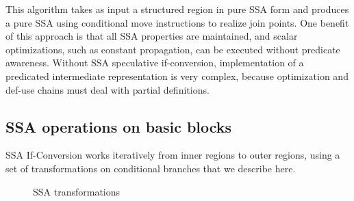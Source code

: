 This algorithm takes as input a structured region in pure SSA form and produces a pure SSA using conditional move instructions to realize join points. One benefit of this approach is that all SSA properties are maintained, and scalar optimizations, such as constant propagation, can be executed without predicate awareness. Without SSA speculative if-conversion, implementation of a predicated intermediate representation is very complex, because optimization and def-use chains must deal with partial definitions.

\subsection{SSA operations on basic blocks}

SSA If-Conversion works iteratively from inner regions to outer regions, using a set of transformations on conditional branches that we describe here.

\begin{figure}[h]
\centering

\caption{SSA transformations}
\label{fig: phi_operations}
\end{figure}

